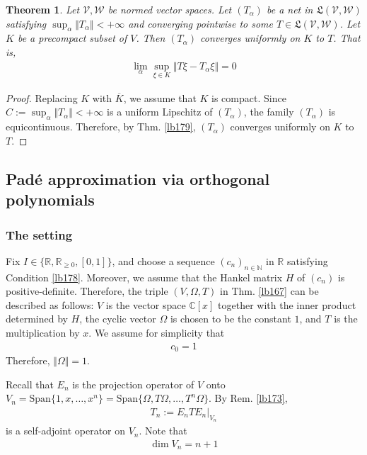\documentclass[12pt,b5paper,notitlepage]{article}
\theoremstyle{definition}
\theoremstyle{plain}
\newtheorem{thm}[df]{Theorem}
\newcommand{\fk}{\mathfrak}
\newcommand{\ovl}{\overline}
\newcommand{\Span}{\mathrm{Span}}
\newcommand{\Cbb}{\mathbb C}
\newcommand{\Nbb}{\mathbb N}
\newcommand{\Rbb}{\mathbb R}
\newcommand{\MV}{\mathcal V}
\newcommand{\MW}{\mathcal W}
\numberwithin{equation}{section}
\begin{document}
\begin{thm}\label{lb187}
Let $\MV,\MW$ be normed vector spaces. Let $(T_\alpha)$ be a net in $\fk L(\MV,\MW)$ satisfying $\sup_\alpha \Vert T_\alpha\Vert<+\infty$ and converging pointwise to some $T\in\fk L(\MV,\MW)$. Let $K$ be a precompact subset of $V$. Then $(T_\alpha)$ converges uniformly on $K$ to $T$. That is,
\begin{align*}
\lim_\alpha \sup_{\xi\in K}\Vert T\xi-T_\alpha\xi\Vert=0
\end{align*}
\end{thm}


\begin{proof}
Replacing $K$ with $\ovl K$, we assume that $K$ is compact. Since $C:=\sup_\alpha\Vert T_\alpha\Vert<+\infty$ is a uniform Lipschitz of $(T_\alpha)$, the family $(T_\alpha)$ is equicontinuous. Therefore, by Thm. \ref{lb179}, $(T_\alpha)$ converges uniformly on $K$ to $T$.
\end{proof}






\subsection{Pad\'e approximation via orthogonal polynomials}


\subsubsection{The setting}\label{lb194}


Fix $I\in\{\Rbb,\Rbb_{\geq0},[0,1]\}$, and choose a sequence $(c_n)_{n\in\Nbb}$ in $\Rbb$ satisfying Condition \ref{lb178}. 
Moreover, we assume that the Hankel matrix $H$ of $(c_n)$ is positive-definite. Therefore, the triple $(V,\Omega,T)$ in Thm. \ref{lb167} can be described as follows: $V$ is the vector space $\Cbb[x]$ together with the inner product determined by $H$, the cyclic vector $\Omega$ is chosen to be the constant $1$, and $T$ is the multiplication by $x$. We assume for simplicity that
\begin{align*}
c_0=1
\end{align*}
Therefore, $\Vert\Omega\Vert=1$.

Recall that $E_n$ is the projection operator of $V$ onto $V_n=\Span\{1,x,\dots,x^n\}=\Span\{\Omega,T\Omega,\dots,T^n\Omega\}$. By Rem. \ref{lb173},
\begin{align*}
T_n:=E_nTE_n\big|_{V_n}
\end{align*}
is a self-adjoint operator on $V_n$. Note that
\begin{align*}
\dim V_n=n+1
\end{align*}
\end{document}

